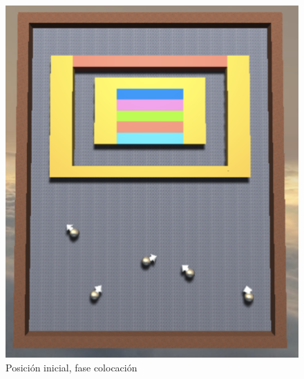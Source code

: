 \documentclass[a4paper, 11pt]{article}
\begin{document}
    
     \begin{figure}[htb!]
     	 \begin{minipage}{0.4\textwidth}
     		\centering
     		\includegraphics[scale=.5]{images/arkanoid_1}
     		\caption{Posición inicial, fase colocación}
     		\label{fig:arkanoid_1}
     	\end{minipage}\hfill
    	\begin{minipage}{0.4\textwidth}
    		\centering

\end{minipage}
\end{figure}
\end{document}
